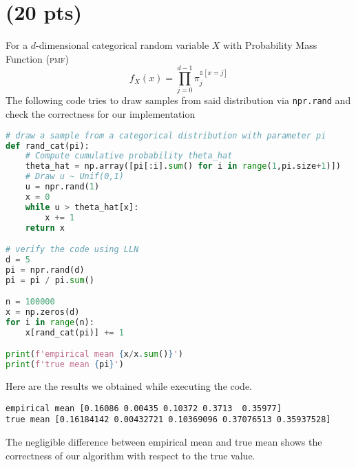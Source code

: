 \section{ (20 pts)}
For a $d$-dimensional categorical random variable $X$ with Probability Mass Function (\textsc{pmf})
\begin{equation*}
	f_X(x) = \prod_{j=0}^{d-1} \pi_j^{\mathds{1}\left[x=j\right]}
\end{equation*}
The following code tries to draw samples from said distribution via \verb|npr.rand| and check the correctness for our implementation
\begin{lstlisting}[language=Python]
# draw a sample from a categorical distribution with parameter pi
def rand_cat(pi):
	# Compute cumulative probability theta_hat
	theta_hat = np.array([pi[:i].sum() for i in range(1,pi.size+1)])
	# Draw u ~ Unif(0,1)
	u = npr.rand(1)
	x = 0
	while u > theta_hat[x]:
		x += 1
	return x

# verify the code using LLN
d = 5
pi = npr.rand(d)
pi = pi / pi.sum()

n = 100000
x = np.zeros(d)
for i in range(n):
	x[rand_cat(pi)] += 1

print(f'empirical mean {x/x.sum()}')
print(f'true mean {pi}')
\end{lstlisting}
Here are the results we obtained while executing the code.
\begin{verbatim}
empirical mean [0.16086 0.00435 0.10372 0.3713  0.35977]
true mean [0.16184142 0.00432721 0.10369096 0.37076513 0.35937528]
\end{verbatim}
The negligible difference between empirical mean and true mean shows the correctness of our algorithm with respect to the true value.